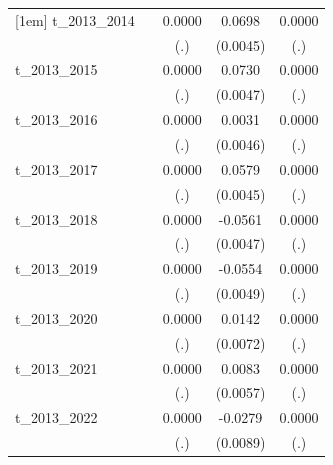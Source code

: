 \begin{table}[htbp]
\begin{tabular}{l*{4}{c}}
[1em]
t\_2013\_2014 &                     &      0.0000         &      0.0698\sym{***}&      0.0000         \\
            &                     &         (.)         &    (0.0045)         &         (.)         \\
[1em]
t\_2013\_2015 &                     &      0.0000         &      0.0730\sym{***}&      0.0000         \\
            &                     &         (.)         &    (0.0047)         &         (.)         \\
[1em]
t\_2013\_2016 &                     &      0.0000         &      0.0031         &      0.0000         \\
            &                     &         (.)         &    (0.0046)         &         (.)         \\
[1em]
t\_2013\_2017 &                     &      0.0000         &      0.0579\sym{***}&      0.0000         \\
            &                     &         (.)         &    (0.0045)         &         (.)         \\
[1em]
t\_2013\_2018 &                     &      0.0000         &     -0.0561\sym{***}&      0.0000         \\
            &                     &         (.)         &    (0.0047)         &         (.)         \\
[1em]
t\_2013\_2019 &                     &      0.0000         &     -0.0554\sym{***}&      0.0000         \\
            &                     &         (.)         &    (0.0049)         &         (.)         \\
[1em]
t\_2013\_2020 &                     &      0.0000         &      0.0142\sym{**} &      0.0000         \\
            &                     &         (.)         &    (0.0072)         &         (.)         \\
[1em]
t\_2013\_2021 &                     &      0.0000         &      0.0083         &      0.0000         \\
            &                     &         (.)         &    (0.0057)         &         (.)         \\
[1em]
t\_2013\_2022 &                     &      0.0000         &     -0.0279\sym{***}&      0.0000         \\
            &                     &         (.)         &    (0.0089)         &         (.)         \\

\end{tabular}
\end{table}
